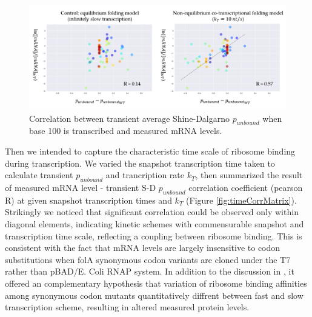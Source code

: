 \documentclass[11pt, a4paper]{article}
\begin{document}
\begin{figure}[htp]
  \centering
  \includegraphics[width=\textwidth]{base100_corr.PNG}
  \caption{Correlation between transient average Shine-Dalgarno $p_{unbound}$ when base 100 is transcribed and measured mRNA levels.}
  \label{fig:base100corr}
\end{figure}

Then we intended to capture the characteristic time scale of ribosome binding during transcription. We varied the snapshot transcription time taken to calculate transient $p_{unbound}$ and trancription rate $k_T$, then summarized the result of measured mRNA level - transient S-D $p_{unbound}$ correlation coefficient (pearson R) at given snapshot transcription times and $k_T$ (Figure \ref{fig:timeCorrMatrix}). Strikingly we noticed that significant correlation could be observed only within diagonal elements, indicating kinetic schemes with commensurable snapshot and transcription time scale, reflecting a coupling between ribosome binding. This is consistent with the fact that mRNA levels are largely insensitive to codon substitutions when folA synonymous codon variants are cloned under the T7 rather than pBAD/E. Coli RNAP system. In addition to the discussion in \cite{}, it offered an complementary hypothesis that variation of ribosome binding affinities among synonymous codon mutants quantitatively diffrent between fast and slow transcription scheme, resulting in altered measured protein levels.
\end{document}
